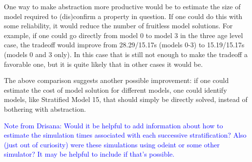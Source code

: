 One way to make abstraction more productive would be to estimate the size of model required to (dis)confirm a property in question.  If one could do this with some reliability, it would reduce the number of fruitless model solutions.  For example, if one could go directly from model 0 to model 3 in the three age level case, the tradeoff would improve from 28.29/15.17s (models 0-3) to 15.19/15.17s (models 0 and 3 only).  In this case that is still not enough to make the tradeoff a favorable one, but it is quite likely that in other cases it would be.

The above comparison suggests another possible improvement: if one could estimate the cost of model solution for different models, one could identify models, like Stratified Model 15, that should simply be directly solved, instead of bothering with abstraction.

\textcolor{blue}{Note from Drisana: Would it be helpful to add information about how to estimate the simulation times associated with each successive stratification?  Also (just out of curiosity) were these simulations using odeint or some other simulator? It may be helpful to include if that's possible.}

